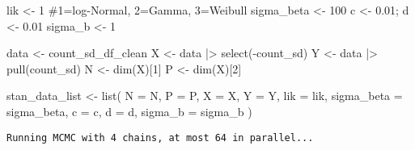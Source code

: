 \documentclass[
  letterpaper,
]{article}
\newenvironment{Shaded}{\begin{snugshade}}{\end{snugshade}}
\newcommand{\AttributeTok}[1]{\textcolor[rgb]{0.40,0.45,0.13}{#1}}
\newcommand{\CommentTok}[1]{\textcolor[rgb]{0.37,0.37,0.37}{#1}}
\newcommand{\DecValTok}[1]{\textcolor[rgb]{0.68,0.00,0.00}{#1}}
\newcommand{\FloatTok}[1]{\textcolor[rgb]{0.68,0.00,0.00}{#1}}
\newcommand{\FunctionTok}[1]{\textcolor[rgb]{0.28,0.35,0.67}{#1}}
\newcommand{\NormalTok}[1]{\textcolor[rgb]{0.00,0.23,0.31}{#1}}
\newcommand{\OtherTok}[1]{\textcolor[rgb]{0.00,0.23,0.31}{#1}}
\newcommand{\SpecialCharTok}[1]{\textcolor[rgb]{0.37,0.37,0.37}{#1}}
\newcommand{\StringTok}[1]{\textcolor[rgb]{0.13,0.47,0.30}{#1}}
\begin{document}
\begin{Shaded}
\begin{Highlighting}[]
\NormalTok{lik }\OtherTok{\textless{}{-}} \DecValTok{1} \CommentTok{\#1=log{-}Normal, 2=Gamma, 3=Weibull}
\NormalTok{sigma\_beta }\OtherTok{\textless{}{-}} \DecValTok{100}
\NormalTok{c }\OtherTok{\textless{}{-}} \FloatTok{0.01}\NormalTok{; d }\OtherTok{\textless{}{-}} \FloatTok{0.01}
\NormalTok{sigma\_b }\OtherTok{\textless{}{-}} \DecValTok{1}

\NormalTok{data }\OtherTok{\textless{}{-}}\NormalTok{ count\_sd\_df\_clean}
\NormalTok{X }\OtherTok{\textless{}{-}}\NormalTok{ data }\SpecialCharTok{|\textgreater{}} \FunctionTok{select}\NormalTok{(}\SpecialCharTok{{-}}\NormalTok{count\_sd)}
\NormalTok{Y }\OtherTok{\textless{}{-}}\NormalTok{ data }\SpecialCharTok{|\textgreater{}} \FunctionTok{pull}\NormalTok{(count\_sd) }
\NormalTok{N }\OtherTok{\textless{}{-}} \FunctionTok{dim}\NormalTok{(X)[}\DecValTok{1}\NormalTok{]}
\NormalTok{P }\OtherTok{\textless{}{-}} \FunctionTok{dim}\NormalTok{(X)[}\DecValTok{2}\NormalTok{]}

\NormalTok{stan\_data\_list }\OtherTok{\textless{}{-}} \FunctionTok{list}\NormalTok{(}
    \AttributeTok{N =}\NormalTok{ N, }\AttributeTok{P =}\NormalTok{ P, }\AttributeTok{X =}\NormalTok{ X, }\AttributeTok{Y =}\NormalTok{ Y, }
    \AttributeTok{lik =}\NormalTok{ lik, }\AttributeTok{sigma\_beta =}\NormalTok{ sigma\_beta, }\AttributeTok{c =}\NormalTok{ c, }\AttributeTok{d =}\NormalTok{ d, }\AttributeTok{sigma\_b =}\NormalTok{ sigma\_b}
\NormalTok{)}
\end{Highlighting}
\end{Shaded}

\begin{Shaded}
\end{Shaded}

\begin{verbatim}
Running MCMC with 4 chains, at most 64 in parallel...
\end{verbatim}
\end{document}
